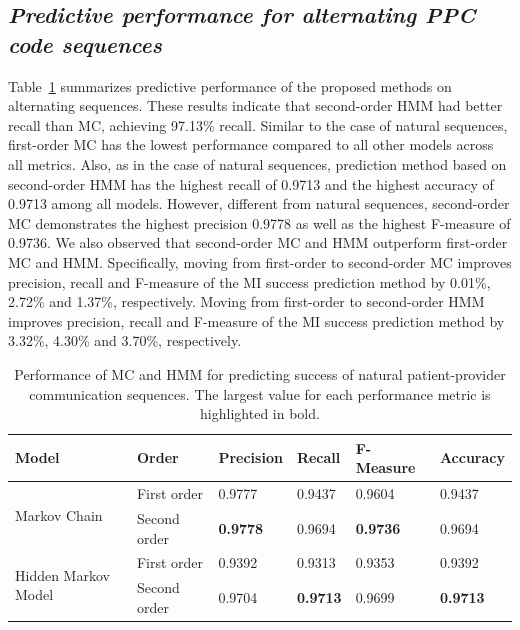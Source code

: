 \documentclass{amia}
\begin{document}
\subsection*{\textit{Predictive performance for alternating PPC code sequences}}
Table~\ref{tab:result_alt_seq} summarizes predictive performance of the proposed methods on alternating sequences. These results indicate that second-order HMM had better recall than MC, achieving 97.13\% recall. Similar to the case of natural sequences, first-order MC has the lowest performance compared to all other models across all metrics. Also, as in the case of natural sequences, prediction method based on second-order HMM has the highest recall of 0.9713 and the highest accuracy of 0.9713 among all models. However, different from natural sequences, second-order MC demonstrates the highest precision 0.9778 as well as the highest F-measure of 0.9736. We also observed that second-order MC and HMM outperform first-order MC and HMM. Specifically, moving from first-order to second-order MC improves precision, recall and F-measure of the MI success prediction method by 0.01\%, 2.72\% and 1.37\%, respectively. Moving from first-order to second-order HMM improves precision, recall and F-measure of the MI success prediction method by 3.32\%, 4.30\% and 3.70\%, respectively.\\

\begin{table}[h]
\centering
\caption{Performance of MC and HMM for predicting success of natural patient-provider communication sequences. The largest value for each performance metric is highlighted in bold.}
\label{tab:result_alt_seq}
  \begin{tabular}{|l|l|l|l|l|l|}
  \hline
   \textbf{Model} & \textbf{Order}  & \textbf{Precision}  & \textbf{Recall} & \textbf{F-Measure} & \textbf{Accuracy}\\ \hline    
    
 \multirow{2}{*}{Markov Chain} & First order & 0.9777 & 0.9437 & 0.9604 & 0.9437\\\cline{2-6}
 & Second order & \textbf{0.9778} & 0.9694 & \textbf{0.9736} & 0.9694\\ \hline
 \multirow{2}{*}{Hidden Markov Model} & First order & 0.9392 & 0.9313 & 0.9353 & 0.9392\\ \cline{2-6}
 & Second order & 0.9704 & \textbf{0.9713} & 0.9699  & \textbf{0.9713}\\ \hline
  \end{tabular}
\end{table}
\end{document}
